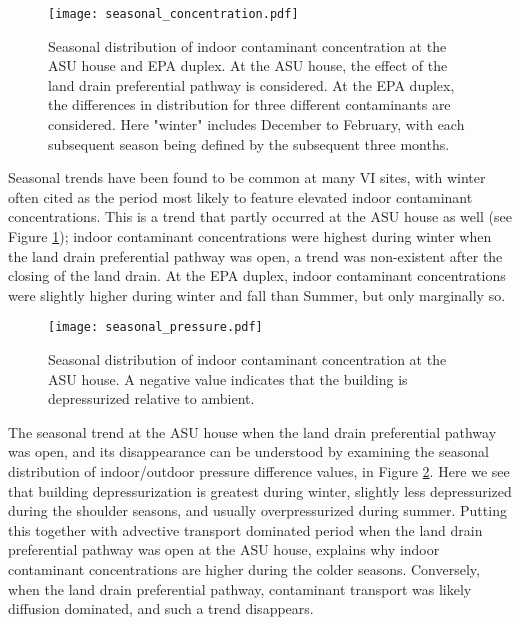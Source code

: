 \begin{figure}[htb!]
  \centering
  \texttt{[image: seasonal\_concentration.pdf]}
  \caption{Seasonal distribution of indoor contaminant concentration at the ASU house and EPA duplex. At the ASU house, the effect of the land drain preferential pathway is considered. At the EPA duplex, the differences in distribution for three different contaminants are considered. Here "winter" includes December to February, with each subsequent season being defined by the subsequent three months.}
  \label{fig:seasonal_concentration}
\end{figure}

Seasonal trends have been found to be common at many VI sites, with winter often cited as the period most likely to feature  elevated indoor contaminant concentrations\cite{burke_estimation_2010,hers_evaluation_2014,miles_temporal_2001,schumacher_fluctuation_2012,steck_indoor_2004}.
This is a trend that partly occurred at the ASU house as well (see Figure \ref{fig:seasonal_concentration}); indoor contaminant concentrations were highest during winter when the land drain preferential pathway was open, a trend was non-existent after the closing of the land drain.
At the EPA duplex, indoor contaminant concentrations were slightly higher during winter and fall than Summer, but only marginally so.\par

\begin{figure}[htb!]
  \centering
  \texttt{[image: seasonal\_pressure.pdf]}
  \caption{Seasonal distribution of indoor contaminant concentration at the ASU house. A negative value indicates that the building is depressurized relative to ambient.}
  \label{fig:seasonal_pressure}
\end{figure}

The seasonal trend at the ASU house when the land drain preferential pathway was open, and its disappearance can be understood by examining the seasonal distribution of indoor/outdoor pressure difference values, in Figure \ref{fig:seasonal_pressure}.
Here we see that building depressurization is greatest during winter, slightly less depressurized during the shoulder seasons, and usually overpressurized during summer.
Putting this together with advective transport dominated period when the land drain preferential pathway was open at the ASU house, explains why indoor contaminant concentrations are higher during the colder seasons.
Conversely, when the land drain preferential pathway, contaminant transport was likely diffusion dominated, and such a trend disappears.\par


